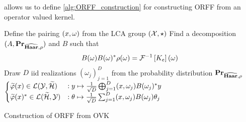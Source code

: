  allows us to define \cref{alg:ORFF_construction} for
constructing \acs{ORFF} from an operator valued kernel.
\begin{center}
    \begin{algorithm2e}[H]\label{alg:ORFF_construction}
        \SetAlgoLined
        \BlankLine
        Define the pairing $(x, \omega)$ from the \acs{LCA} group
        $(\mathcal{X}, \star)$\; Find a decomposition
        $(A,{\mathbf{{Pr}}}_{\widehat{\mathbf{Haar}},\rho})$ and $B$ such that
        \begin{dmath*}
            B(\omega)B(\omega)^\adjoint \rho(\omega)=\IFT{K_e}(\omega)\text{\;}
        \end{dmath*}
        \nl Draw $D$ \acs{iid} realizations $(\omega_j)_{j=1}^D$ from the
        probability distribution ${\mathbf{{Pr}}}_{\widehat{\mathbf{Haar}},\rho}$\;
        \nl \Return
        $\begin{cases}
            \tildePhi{\omega}(x) \in \mathcal{L}(\mathcal{Y}, \tildeH{\omega})
            &: y \mapsto \frac{1}{\sqrt{D}}\Vect_{j=1}^D\pairing{x,
            \omega_j}B(\omega_j)^\adjoint y \\ 
            \tildePhi{\omega}(x)^\adjoint \in\mathcal{L}(\tildeH{\omega},
            \mathcal{Y}) &: \theta \mapsto \frac{1}{\sqrt{D}} \sum_{j=1}^D
            \pairing{x, \omega_j}B(\omega_j)\theta_j 
        \end{cases}$\;
        \caption{Construction of \acs{ORFF} from \acs{OVK}}
    \end{algorithm2e}
\end{center}
